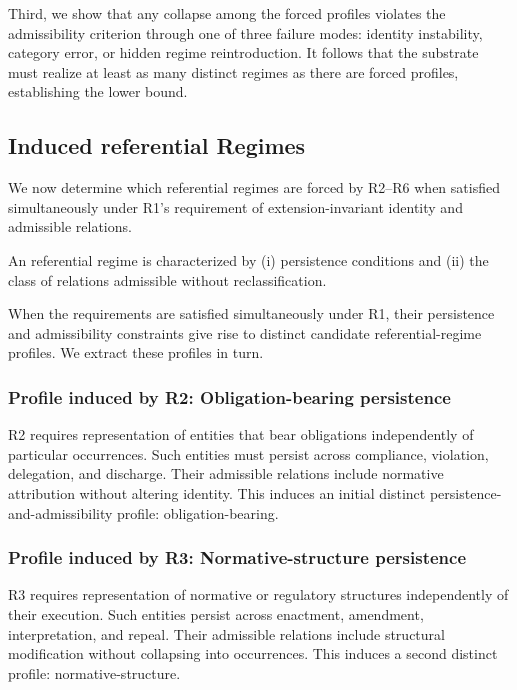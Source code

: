 Third, we show that any collapse among the forced profiles
violates the admissibility criterion through one of three failure modes:
identity instability, category error, or hidden regime reintroduction.
It follows that the substrate must realize at least as many distinct regimes
as there are forced profiles, establishing the lower bound.


\subsection{Induced referential Regimes}
\label{sec:regimes}

We now determine which referential regimes
are forced by R2--R6 when satisfied simultaneously
under R1's requirement of extension-invariant identity
and admissible relations.

An referential regime is characterized by
(i) persistence conditions and
(ii) the class of relations admissible without reclassification.

When the requirements are satisfied simultaneously under R1,
their persistence and admissibility constraints give rise to
distinct candidate referential-regime profiles.
We extract these profiles in turn.

\subsubsection{Profile induced by R2: Obligation-bearing persistence}

R2 requires representation of entities that bear obligations independently of particular occurrences.
Such entities must persist across compliance, violation, delegation, and discharge.
Their admissible relations include normative attribution without altering identity.
This induces an initial distinct persistence-and-admissibility profile: obligation-bearing.

\subsubsection{Profile induced by R3: Normative-structure persistence}

R3 requires representation of normative or regulatory structures independently of their execution.
Such entities persist across enactment, amendment, interpretation, and repeal.
Their admissible relations include structural modification without collapsing into occurrences.
This induces a second distinct profile: normative-structure.

